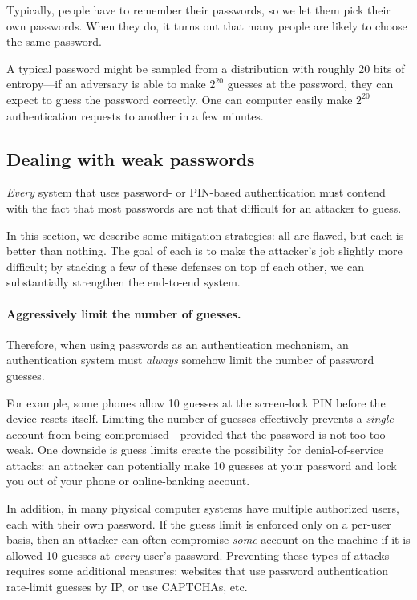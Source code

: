 Typically, people have to remember their passwords,
so we let them pick their own passwords.
When they do,
it turns out that many people are likely to choose
the same password.

A typical password might be sampled from a distribution with roughly
20 bits of 
entropy---if an adversary is able to make $2^{20}$ guesses
at the password, they can expect to guess the password correctly.
One can computer easily make $2^{20}$
authentication requests to another in a few
minutes.

\subsection{Dealing with weak passwords}

\emph{Every} system that uses password- or PIN-based authentication
must contend with the fact that most passwords are not that difficult
for an attacker to guess.

In this section, we describe some mitigation strategies: all are flawed,
but each is better than nothing. The goal of each is to make the attacker's
job slightly more difficult; by stacking a few of these defenses on top
of each other, we can substantially strengthen the end-to-end system.

\paragraph{Aggressively limit the number of guesses.}
Therefore, when using passwords as an authentication
mechanism, an authentication system must \emph{always} 
somehow limit the number of password guesses.

For example, some phones allow 10 guesses at the screen-lock PIN 
before the device resets itself.
Limiting the number of guesses effectively prevents a \emph{single}
account from being compromised---provided that the password is not
too too weak.
One downside is guess limits create the possibility for denial-of-service
attacks: an attacker can potentially make 10 guesses at your password and lock
you out of your phone or online-banking account.

In addition, in many physical computer systems have multiple authorized 
users, each with their own password.
If the guess limit is enforced only on a per-user basis, then an attacker
can often compromise \emph{some} account on the machine if it is allowed
10 guesses at \emph{every} user's password.
Preventing these types of attacks requires some additional measures: websites
that use password authentication rate-limit guesses by IP, or use CAPTCHAs, etc.

